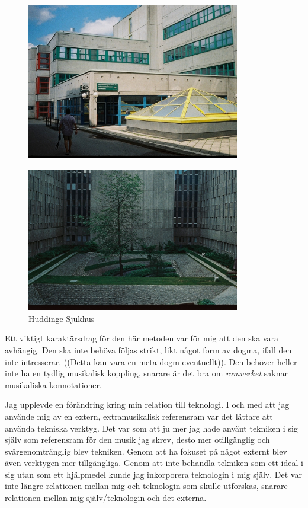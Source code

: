 \documentclass{article}
\begin{document}

\begin{figure}
	\centering
	\includegraphics[keepaspectratio, width=0.83\textwidth]{innergaard2} \\

	\vspace*{-0.3mm}

	\includegraphics[keepaspectratio, width=0.83\textwidth]{innergaard1}
	\caption{Huddinge Sjukhus}
\end{figure}

Ett viktigt karaktärsdrag för den här metoden var för mig att den ska vara avhängig. Den ska inte behöva
följas strikt, likt något form av dogma, ifall den inte intresserar. ((Detta kan vara en meta-dogm
eventuellt)). Den behöver heller inte ha en tydlig musikalisk koppling, snarare är det bra om \emph{ramverket}
saknar musikaliska konnotationer.

Jag upplevde en förändring kring min relation till teknologi. I och med att jag använde mig av en extern,
extramusikalisk referensram var det lättare att använda tekniska verktyg. Det var som att ju mer jag hade
använt tekniken i sig själv som referensram för den musik jag skrev, desto mer otillgänglig och
svårgenomtränglig blev tekniken. Genom att ha fokuset på något externt blev även verktygen mer tillgängliga.
Genom att inte behandla tekniken som ett ideal i sig utan som ett hjälpmedel kunde jag inkorporera teknologin
i mig själv. Det var inte längre relationen mellan mig och teknologin som skulle utforskas, snarare relationen
mellan mig själv/teknologin och det externa. 
\end{document}
